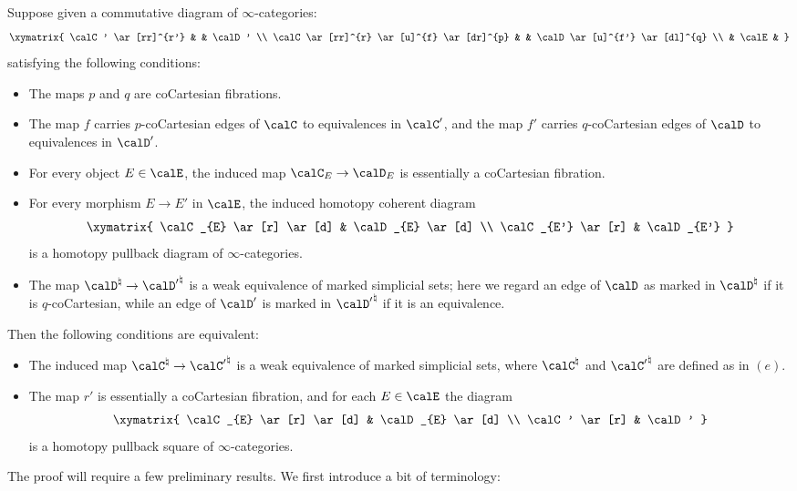 \begin{proposition}\label{custa2}
Suppose given a commutative diagram of $\infty$-categories:
$$ \xymatrix{ \calC' \ar[rr]^{r'} &  & \calD' \\
\calC \ar[rr]^{r} \ar[u]^{f} \ar[dr]^{p} & & \calD \ar[u]^{f'} \ar[dl]^{q} \\
& \calE & }$$
satisfying the following conditions:
\begin{itemize}
\item[$(a)$] The maps $p$ and $q$ are coCartesian fibrations.
\item[$(b)$] The map $f$ carries $p$-coCartesian edges of $\calC$ to equivalences in $\calC'$, 
and the map $f'$ carries $q$-coCartesian edges of $\calD$ to equivalences in $\calD'$.
\item[$(c)$] For every object $E \in \calE$, the induced map $\calC_{E} \rightarrow \calD_{E}$ is
essentially a coCartesian fibration.
\item[$(d)$] For every morphism $E \rightarrow E'$ in $\calE$, the induced homotopy coherent diagram
$$ \xymatrix{ \calC_{E} \ar[r] \ar[d] & \calD_{E} \ar[d] \\
\calC_{E'} \ar[r] & \calD_{E'} }$$
is a homotopy pullback diagram of $\infty$-categories.
\item[$(e)$] The map $\calD^{\natural} \rightarrow {\calD'}^{\natural}$ is a weak equivalence of marked simplicial sets; here we regard an edge of $\calD$ as marked in $\calD^{\natural}$ if it is $q$-coCartesian, while an edge of $\calD'$ is marked in ${\calD'}^{\natural}$ if it is an equivalence.
\end{itemize}
Then the following conditions are equivalent:
\begin{itemize}
\item[$(1)$] The induced map $\calC^{\natural} \rightarrow { \calC'}^{\natural}$ is a weak equivalence of marked simplicial sets, where $\calC^{\natural}$ and ${ \calC' }^{\natural}$ are defined as in $(e)$.

\item[$(2)$] The map $r'$ is essentially a coCartesian fibration, and for each $E \in \calE$ the diagram
$$ \xymatrix{ \calC_{E} \ar[r] \ar[d] & \calD_{E} \ar[d] \\
\calC' \ar[r] & \calD' }$$
is a homotopy pullback square of $\infty$-categories.
\end{itemize}
\end{proposition}

The proof will require a few preliminary results. We first introduce a bit of terminology:

